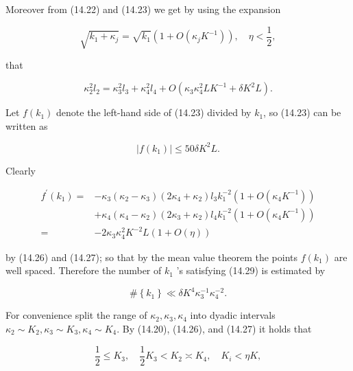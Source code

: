 \documentclass[10pt]{article}
\begin{document}
Moreover from (14.22) and (14.23) we get by using the expansion

$$
\sqrt{k_{1}+\kappa_{j}}=\sqrt{k_{1}}\left(1+O\left(\kappa_{j} K^{-1}\right)\right), \quad \eta<\frac{1}{2},
$$

that


\begin{equation*}
\kappa_{2}^{2} l_{2}=\kappa_{3}^{2} l_{3}+\kappa_{4}^{2} l_{4}+O\left(\kappa_{3} \kappa_{4}^{2} L K^{-1}+\delta K^{2} L\right) . \tag{14.28}
\end{equation*}


Let $f\left(k_{1}\right)$ denote the left-hand side of (14.23) divided by $k_{1}$, so (14.23) can be written as


\begin{equation*}
\left|f\left(k_{1}\right)\right| \leqslant 50 \delta K^{2} L . \tag{14.29}
\end{equation*}


Clearly

$$
\begin{aligned}
f^{\prime}(k_{1})= & -\kappa_{3}\left(\kappa_{2}-\kappa_{3}\right)\left(2 \kappa_{4}+\kappa_{2}\right) l_{3} k_{1}^{-2}\left(1+O\left(\kappa_{4} K^{-1}\right)\right) \\
& +\kappa_{4}\left(\kappa_{4}-\kappa_{2}\right)\left(2 \kappa_{3}+\kappa_{2}\right) l_{4} k_{1}^{-2}\left(1+O\left(\kappa_{4} K^{-1}\right)\right) \\
= & -2 \kappa_{3} \kappa_{4}^{2} K^{-2} L(1+O(\eta))
\end{aligned}
$$

by (14.26) and (14.27); so that by the mean value theorem the points $f\left(k_{1}\right)$ are well spaced. Therefore the number of $k_{1}$ 's satisfying (14.29) is estimated by


\begin{equation*}
\#\left\{k_{1}\right\}\ll\delta K^{4} \kappa_{3}^{-1} \kappa_{4}^{-2} . \tag{14.30}
\end{equation*}


For convenience split the range of $\kappa_{2}, \kappa_{3}, \kappa_{4}$ into dyadic intervals $\kappa_{2} \sim K_{2}, \kappa_{3} \sim K_{3}, \kappa_{4} \sim K_{4}$. By (14.20), (14.26), and (14.27) it holds that


\begin{equation*}
\frac{1}{2} \leqslant K_{3}, \quad \frac{1}{2} K_{3}<K_{2} \asymp K_{4}, \quad K_{i}<\eta K, \tag{14.31}
\end{equation*}
\end{document}
